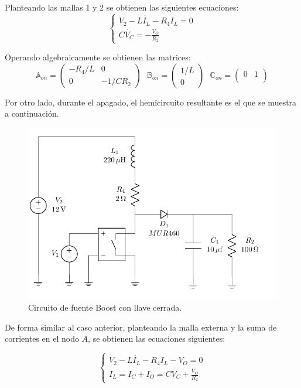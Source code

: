 Planteando las mallas 1 y 2 se obtienen las siguientes ecuaciones:
\begin{equation*}
\begin{cases}
V_2 - L \dot{I_L} - R_4 I_L = 0 \\
C \dot{V_C} = -\frac{V_O}{R_2}
\end{cases}
\end{equation*}

Operando algebraicamente se obtienen las matrices: 
\begin{equation}
\mathbb{A}_{on} =  \begin{pmatrix}
	-R_4/L & 0 \\
	0 & -1/ C R_2
\end{pmatrix} \ \ \
\mathbb{B}_{on} =  \begin{pmatrix}
	1/L \\
	0
\end{pmatrix} \ \ \
\mathbb{C}_{on} =  \begin{pmatrix}
	0 & 1 \\
\end{pmatrix}
\end{equation}

Por otro lado, durante el apagado, el hemicircuito resultante es el que se muestra a continuación.

\begin{figure}[H]
	\centering
	\includegraphics[width=0.8\linewidth, page=3]{ImagenesEjercicio-2/CircuitsEj2}
	\caption{Circuito de fuente Boost con llave cerrada.}
	\label{fig:ej2:on}
\end{figure}

De forma similar al caso anterior, planteando la malla externa y la suma de corrientes en el nodo $A$, se obtienen las ecuaciones siguientes:

\begin{equation*}
\begin{cases}
V_2 - L \dot{I_L} - R_4 I_L - V_O = 0 \\
I_L = I_C + I_O = C\dot{V_C} + \frac{V_O}{R_2}
\end{cases}
\end{equation*}

